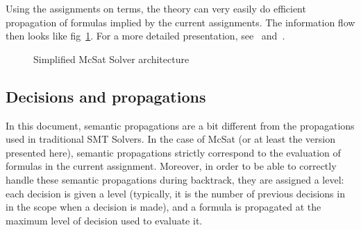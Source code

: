 Using the assignments on terms, the theory can very easily do efficient
propagation of formulas implied by the current assignments.
The information flow then looks like fig~\ref{fig:mcsat_flow}.
For a more detailed presentation, see~\cite{FMCAD13} and~\cite{VMCAI13}.

\begin{figure}
  \begin{center}
  \end{center}
  \caption{Simplified McSat Solver architecture}\label{fig:mcsat_flow}
\end{figure}

\subsection{Decisions and propagations}

In this document, semantic propagations are a bit different from the propagations
used in traditional SMT Solvers. In the case of McSat (or at least the version presented here),
semantic propagations strictly correspond to the evaluation of formulas in the
current assignment. Moreover, in order to be able to correctly handle these semantic
propagations during backtrack, they are assigned a level: each decision is given a level
(typically, it is the number of previous decisions in in the scope when a decision is made),
and a formula is propagated at the maximum level of decision used to evaluate it.


